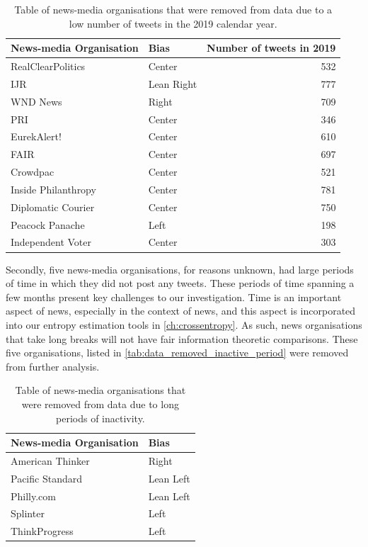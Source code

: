 \begin{table}[!htbp]
	\centering
	\begin{tabular}{llr}
		\toprule
		News-media Organisation &    Bias  &  Number of tweets in 2019\\
		\midrule
		RealClearPolitics &      Center &  532 \\
		IJR  &  Lean Right &  777 \\
		WND News &         Right &  709 \\
		PRI &                Center &  346 \\
		EurekAlert! &            Center &  610 \\
		FAIR &     Center &  697 \\
		Crowdpac &            Center &  521 \\
		Inside Philanthropy &        Center &  781 \\
		Diplomatic Courier &         Center &  750 \\
		Peacock Panache &          Left &  198 \\
		Independent Voter &            Center &  303 \\
		\bottomrule
	\end{tabular}
\caption{Table of news-media organisations that were removed from data due to a low number of tweets in the 2019 calendar year.}
\label{tab:data_removed_low_tweet_counts}
\end{table}

Secondly, five news-media organisations, for reasons unknown, had large periods of time in which they did not post any tweets. These periods of time spanning a few months present key challenges to our investigation. 
Time is an important aspect of news, especially in the context of news, and this aspect is incorporated into our entropy estimation tools in \autoref{ch:crossentropy}. As such, news organisations that take long breaks will not have fair information theoretic comparisons. These five organisations, listed in \autoref{tab:data_removed_inactive_period} were removed from further analysis.

\begin{table}[!htbp]
	\centering
	\begin{tabular}{ll}
		\toprule
		News-media Organisation &    Bias \\
		\midrule
		American Thinker  &      Right \\
		Pacific Standard &  Lean Left \\
		Philly.com  &  Lean Left \\
		Splinter &       Left \\
		ThinkProgress  &       Left \\
		\bottomrule
	\end{tabular}
	\caption{Table of news-media organisations that were removed from data due to long periods of inactivity.}
	\label{tab:data_removed_inactive_period}
\end{table}


